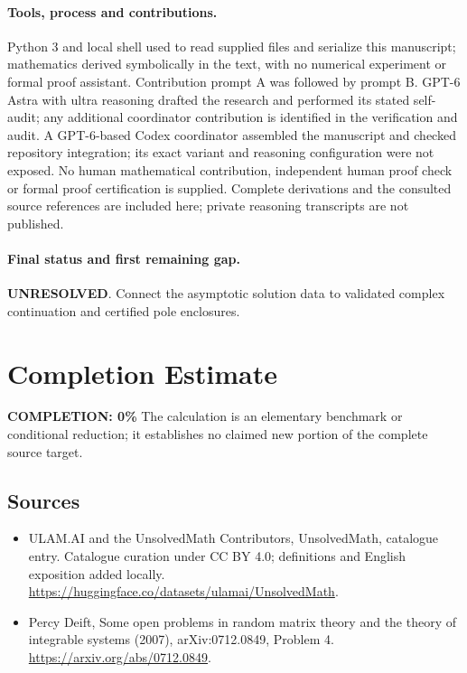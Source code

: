 \documentclass[11pt]{article}
\begin{document}
\paragraph{Tools, process and contributions.}
Python 3 and local shell used to read supplied files and serialize this manuscript; mathematics derived symbolically in the text, with no numerical experiment or formal proof assistant. Contribution prompt A was followed by prompt B. GPT-6 Astra with ultra reasoning drafted the research and performed its stated self-audit; any additional coordinator contribution is identified in the verification and audit. A GPT-6-based Codex coordinator assembled the manuscript and checked repository integration; its exact variant and reasoning configuration were not exposed. No human mathematical contribution, independent human proof check or formal proof certification is supplied. Complete derivations and the consulted source references are included here; private reasoning transcripts are not published.

\paragraph{Final status and first remaining gap.}
\textbf{UNRESOLVED}. Connect the asymptotic solution data to validated complex continuation and certified pole enclosures.

\section{Completion Estimate}
\noindent\textbf{COMPLETION: 0\%}
The calculation is an elementary benchmark or conditional reduction; it establishes no claimed new portion of the complete source target.

\subsection{Sources}
\begin{itemize}
\item[\hypertarget{source:statement:1}{S1}] ULAM.AI and the UnsolvedMath Contributors, UnsolvedMath, catalogue entry. Catalogue curation under CC BY 4.0; definitions and English exposition added locally.
\url{https://huggingface.co/datasets/ulamai/UnsolvedMath}.
\item[\hypertarget{source:statement:2}{S2}] Percy Deift, Some open problems in random matrix theory and the theory of integrable systems (2007), arXiv:0712.0849, Problem 4.
\url{https://arxiv.org/abs/0712.0849}.
\end{itemize}
\label{end:statement}
\end{document}
